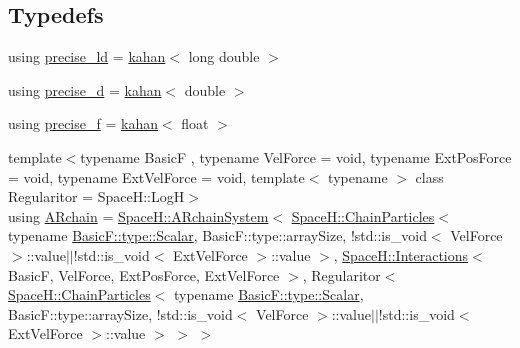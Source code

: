 \subsection*{Typedefs}
\begin{DoxyCompactItemize}
\item 
using \mbox{\hyperlink{namespace_space_h_a97ab24f59c6eea385c71d6062b8535ed}{precise\+\_\+ld}} = \mbox{\hyperlink{struct_space_h_1_1kahan}{kahan}}$<$ long double $>$
\item 
using \mbox{\hyperlink{namespace_space_h_a50a1e263353add842b5f87190a4f9254}{precise\+\_\+d}} = \mbox{\hyperlink{struct_space_h_1_1kahan}{kahan}}$<$ double $>$
\item 
using \mbox{\hyperlink{namespace_space_h_a111f58b8dcf751e23fe4edd34ebf329e}{precise\+\_\+f}} = \mbox{\hyperlink{struct_space_h_1_1kahan}{kahan}}$<$ float $>$
\item 
{\footnotesize template$<$typename BasicF , typename Vel\+Force  = void, typename Ext\+Pos\+Force  = void, typename Ext\+Vel\+Force  = void, template$<$ typename $>$ class Regularitor = Space\+H\+::\+LogH$>$ }\\using \mbox{\hyperlink{namespace_space_h_abc1e09cc3d2e2a92798269be7035b23d}{A\+Rchain}} = \mbox{\hyperlink{class_space_h_1_1_a_rchain_system}{Space\+H\+::\+A\+Rchain\+System}}$<$ \mbox{\hyperlink{class_space_h_1_1_chain_particles}{Space\+H\+::\+Chain\+Particles}}$<$ typename \mbox{\hyperlink{test_orbit_8cpp_a8c2981f3f834be9448a6ab06c28748eb}{Basic\+F\+::type\+::\+Scalar}}, Basic\+F\+::type\+::array\+Size, !std\+::is\+\_\+void$<$ Vel\+Force $>$\+::value$\vert$$\vert$!std\+::is\+\_\+void$<$ Ext\+Vel\+Force $>$\+::value $>$, \mbox{\hyperlink{class_space_h_1_1_interactions}{Space\+H\+::\+Interactions}}$<$ BasicF, Vel\+Force, Ext\+Pos\+Force, Ext\+Vel\+Force $>$, Regularitor$<$ \mbox{\hyperlink{class_space_h_1_1_chain_particles}{Space\+H\+::\+Chain\+Particles}}$<$ typename \mbox{\hyperlink{test_orbit_8cpp_a8c2981f3f834be9448a6ab06c28748eb}{Basic\+F\+::type\+::\+Scalar}}, Basic\+F\+::type\+::array\+Size, !std\+::is\+\_\+void$<$ Vel\+Force $>$\+::value$\vert$$\vert$!std\+::is\+\_\+void$<$ Ext\+Vel\+Force $>$\+::value $>$ $>$ $>$
\item 

\end{DoxyCompactItemize}
